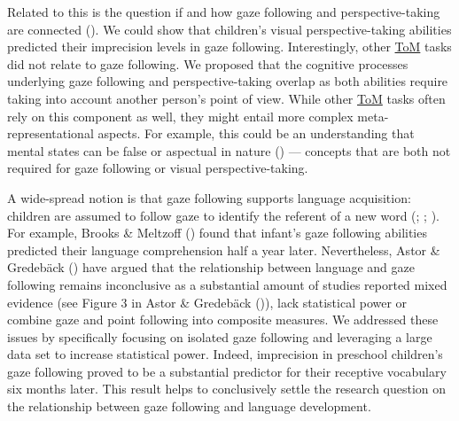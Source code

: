 \documentclass[
]{scrbook}
\begin{document}
Related to this is the question if and how gaze following and perspective-taking are connected (). We could show that children's visual perspective-taking abilities predicted their imprecision levels in gaze following. Interestingly, other \hyperref[acronyms_ToM]{ToM} tasks did not relate to gaze following. We proposed that the cognitive processes underlying gaze following and perspective-taking overlap as both abilities require taking into account another person's point of view. While other \hyperref[acronyms_ToM]{ToM} tasks often rely on this component as well, they might entail more complex meta-representational aspects. For example, this could be an understanding that mental states can be false or aspectual in nature () --- concepts that are both not required for gaze following or visual perspective-taking.

A wide-spread notion is that gaze following supports language acquisition: children are assumed to follow gaze to identify the referent of a new word (; ; ). For example, Brooks \& Meltzoff () found that infant's gaze following abilities predicted their language comprehension half a year later. Nevertheless, Astor \& Gredebäck () have argued that the relationship between language and gaze following remains inconclusive as a substantial amount of studies reported mixed evidence (see Figure 3 in Astor \& Gredebäck ()), lack statistical power or combine gaze and point following into composite measures. We addressed these issues by specifically focusing on isolated gaze following and leveraging a large data set to increase statistical power. Indeed, imprecision in preschool children's gaze following proved to be a substantial predictor for their receptive vocabulary six months later. This result helps to conclusively settle the research question on the relationship between gaze following and language development.
\end{document}
